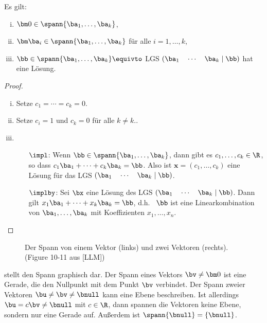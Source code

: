 \begin{lemma}
	Es gilt:
	\begin{enumerate}[(i)]
		\item $\bm 0 \in \spann\{\ba_1, \dots, \ba_k\}$,
		\item $\bm \ba_i \in \spann\{\ba_1, \dots, \ba_k\}$ für alle $i = 1, \dots, k$,
		\item $\bb \in \spann\{\ba_1, \dots, \ba_k\} \equivto$ LGS $(\ba_1 \quad \cdots \quad \ba_k \mid \bb)$ hat eine Lösung.
	\end{enumerate}
\end{lemma}
\begin{proof} \quad \\[-12pt]
	\begin{enumerate}[(i)]
		\item Setze $c_1 = \cdots = c_k = 0$.
		\item Setze $c_i = 1$ und $c_k = 0$ für alle $k \neq k$..
		\item \begin{itemize}
			      \item[$\impl$:] Wenn $\bb \in \spann\{\ba_1, \dots, \ba_k\}$, dann gibt es $c_1, \dots, c_k \in \R$, so dass $c_1 \ba_1 + \cdots + c_k \ba_k = \bb$. Also ist $\bm x = (c_1, \dots, c_k)$ eine Lösung für das LGS $(\ba_1 \quad \cdots \quad \ba_k \mid \bb)$.
			      \item[$\implby$:] Sei $\bx$ eine Lösung des LGS $(\ba_1 \quad \cdots \quad \ba_k \mid \bb)$. Dann gilt $x_1 \ba_1 + \cdots + x_k \ba_k = \bb$, d.h.~ $\bb$ ist eine Linearkombination von $\ba_1, \dots, \ba_k$ mit Koeffizienten $x_1, \dots, x_n$. \qedhere
		      \end{itemize}
	\end{enumerate}
\end{proof}


\begin{figure}
	\centering
	\caption{Der Spann von einem Vektor (links) und zwei Vektoren (rechts). (Figure 10-11 aus [LLM])}
	\label{fig:2:spann}
\end{figure}

 stellt den Spann graphisch dar. Der Spann eines Vektors $\bv \neq \bm 0$ ist eine Gerade, die den Nullpunkt mit dem Punkt $\bv$ verbindet. Der Spann zweier Vektoren $\bu \neq \bv \neq \bnull$ kann eine Ebene beschreiben. Ist allerdings $\bu = c \bv \neq \bnull$ mit $c \in \R$, dann spannen die Vektoren keine Ebene, sondern nur eine Gerade auf. Außerdem ist $\spann\{\bnull\} = \{\bnull\}$. 


